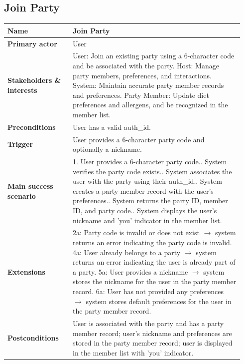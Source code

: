 \documentclass[sigconf]{acmart}
\begin{document}
\subsection*{Join Party}
{\footnotesize
\begin{supertabular}{@{}p{0.26\linewidth}p{0.68\linewidth}@{}}
\textbf{Name} & Join Party \\
\hline
\textbf{Primary actor} & User \\
\hline
\textbf{Stakeholders \& interests} & User: Join an existing party using a 6-character code and be associated with the party. Host: Manage party members, preferences, and interactions. System: Maintain accurate party member records and preferences. Party Member: Update diet preferences and allergens, and be recognized in the member list. \\
\hline
\textbf{Preconditions} & User has a valid auth\_id. \\
\hline
\textbf{Trigger} & User provides a 6-character party code and optionally a nickname. \\
\hline
\textbf{Main success scenario} & 1. User provides a 6-character party code.. System verifies the party code exists.. System associates the user with the party using their auth\_id.. System creates a party member record with the user's preferences.. System returns the party ID, member ID, and party code.. System displays the user's nickname and 'you' indicator in the member list. \\
\hline
\textbf{Extensions} & 2a: Party code is invalid or does not exist $\rightarrow$ system returns an error indicating the party code is invalid.\newline
4a: User already belongs to a party $\rightarrow$ system returns an error indicating the user is already part of a party.\newline
5a: User provides a nickname $\rightarrow$ system stores the nickname for the user in the party member record.\newline
6a: User has not provided any preferences $\rightarrow$ system stores default preferences for the user in the party member record. \\
\hline
\textbf{Postconditions} & User is associated with the party and has a party member record; user's nickname and preferences are stored in the party member record; user is displayed in the member list with 'you' indicator. \\
\end{supertabular}
}
\end{document}
